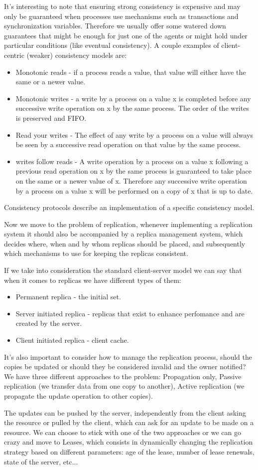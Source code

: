It's interesting to note that ensuring strong consistency is expensive and may only be guaranteed when processes use mechanisms such as transactions and synchronization variables. Therefore we usually offer some watered down guarantees that might be enough for just one of the agents or might hold under particular conditions (like eventual consistency). A couple examples of client-centric (weaker) consistency models are:
\begin{itemize}
    \item Monotonic reads - if a process reads a value, that value will either have the same or a newer value.
    \item Monotonic writes - a write by a process on a value x is completed before any successive write operation on x by the same process. The order of the writes is preserved and FIFO.
    \item Read your writes - The effect of any write by a process on a value will always be seen by a successive read operation on that value by the same process.
    \item writes follow reads - A write operation by a process on a value x following a previous read operation on x by the same process is guaranteed to take place on the same or a newer value of x. Therefore any successive write operation by a process on a value x will be performed on a copy of x that is up to date.
\end{itemize}
Consistency protocols describe an implementation of a specific consistency model.

Now we move to the problem of replication, whenever implementing a replication system it should also be accompanied by a replica management system, which decides where, when and by whom replicas should be placed, and subsequently which mechanisms to use for keeping the replicas consistent.

If we take into consideration the standard client-server model we can say that when it comes to replicas we have different types of them:
\begin{itemize}
    \item Permanent replica - the initial set.
    \item Server initiated replica - replicas that exist to enhance perfomance and are created by the server.
    \item Client initiated replica - client cache.
\end{itemize}
It's also important to consider how to manage the replication process, should the copies be updated or should they be considered invalid and the owner notified? We have three different approaches to the problem: Propagation only, Passive replication (we transfer data from one copy to another), Active replication (we propagate the update operation to other copies).

The updates can be pushed by the server, independently from the client asking the resource or pulled by the client, which can ask for an update to be made on a resource. We can choose to stick with one of the two approaches or we can go crazy and move to Leases, which consists in dynamically changing the replication strategy based on different parameters: age of the lease, number of lease renewals, state of the server, etc...
